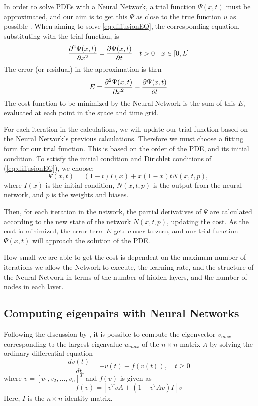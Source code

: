 In order to solve PDEs with a Neural Network, a trial function $\Psi (x,t)$ must be approximated, and our aim is to get this $\Psi$ as close to the true function $u$ as possible \citep{lagaris1998artificial}. When aiming to solve \eqref{eq:diffusionEQ}, the corresponding equation, substituting with the trial function, is
\begin{equation*}
    \pdv[2]{\Psi(x,t)}{x} = \pdv{\Psi(x,t)}{t} \quad t>0 \quad x\in [0,L]
\end{equation*}
The error (or residual) in the approximation is then
\begin{equation}
    E = \pdv[2]{\Psi(x,t)}{x} - \pdv{\Psi(x,t)}{t}
    \label{eq:errorFunc}
\end{equation}
The cost function to be minimized by the Neural Network is the sum of this $E$, evaluated at each point in the space and time grid.

For each iteration in the calculations, we will update our trial function based on the Neural Network's previous calculations. Therefore we must choose a fitting form for our trial function. This is based on the order of the PDE, and its initial condition. To satisfy the initial condition and Dirichlet conditions of (\eqref{eq:diffusionEQ}), we choose:
\begin{equation}
    \Psi (x,t) = (1-t)I(x) + x(1-x)tN(x,t,p),
    \label{eq:trialFunction}
\end{equation}
where $I(x)$ is the initial condition, $N(x,t,p)$ is the output from the neural network, and $p$ is the weights and biases.

Then, for each iteration in the network, the partial derivatives of $\Psi$ are calculated according to the new state of the network $N(x, t, p)$, updating the cost. As the cost is minimized, the error term $E$ gets closer to zero, and our trial function $\Psi (x,t)$ will approach the solution of the PDE.

How small we are able to get the cost is dependent on the maximum number of iterations we allow the Network to execute, the learning rate, and the structure of the Neural Network in terms of the number of hidden layers, and the number of nodes in each layer.

\subsection{Computing eigenpairs with Neural Networks}
Following the discussion by \cite{yi2004neural}, it is possible to compute the eigenvector $v_{max}$ corresponding to the largest eigenvalue $w_{max}$ of the $n\times n$ matrix $A$ by solving the ordinary differential equation
\begin{equation}\label{eq:eigenDE}
	\frac{dv(t)}{dt} = -v(t) + f(v(t)), \quad t\geq 0
\end{equation}
 where $v = [v_1,v_2,\ldots,v_n]^T$ and $f(v)$ is given as
 \begin{equation}\label{eq:f}
 f(v) = \left[v^TvA + \left(1-v^TAv\right)I\right]v
 \end{equation}
Here, $I$ is the $n\times n$ identity matrix.

